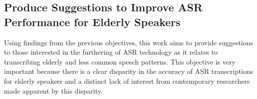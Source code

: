 \subsection{Produce Suggestions to Improve ASR Performance for Elderly Speakers}\label{subsec:aim4}

Using findings from the previous objectives, this work aims to provide suggestions to those
interested in the furthering of ASR technology as it relates to transcribing elderly and less
common speech patterns.
This objective is very important because there is a clear disparity in the accuracy of ASR
transcriptions for elderly speakers and a distinct lack of interest from contemporary researchers
made apparent by this disparity.
